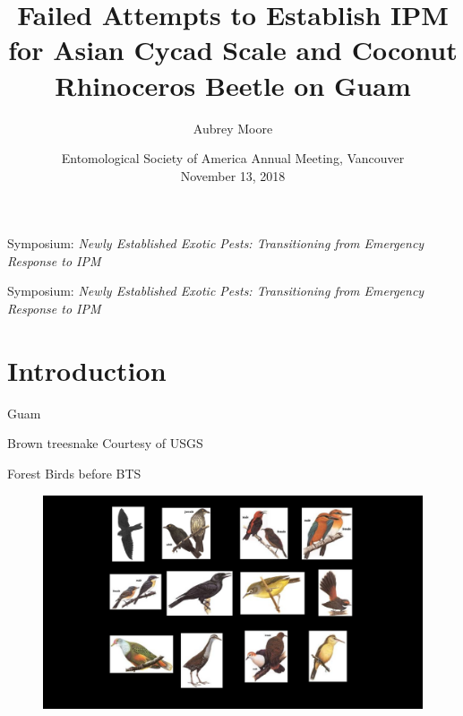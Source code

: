 \documentclass[]{beamer}
\title[IPM Failures on Guam]{Failed Attempts to Establish IPM for Asian Cycad Scale and Coconut Rhinoceros Beetle on Guam}
\author{Aubrey Moore}
\institute[University of Guam]{College of Natural and Applied Sciences\\University of Guam}
\date[]{Entomological Society of America Annual Meeting, Vancouver\\November 13, 2018}
\begin{document}

\begin{frame}
	\scriptsize{Symposium: \textit{Newly Established Exotic Pests: Transitioning from Emergency Response to IPM}}
	\titlepage
\end{frame}

\begin{frame}
	\scriptsize{Symposium: \textit{Newly Established Exotic Pests: Transitioning from Emergency Response to IPM}}
	\titlepage
\end{frame}



\section{Introduction}

\begin{frame}{Guam}
\end{frame}

\begin{frame}{Brown treesnake}
	\tiny{Courtesy of USGS}
\end{frame}

\begin{frame}{Forest Birds before BTS}
	\begin{figure}
		\includegraphics[height=0.8\textheight]{birds-before-bts.png}
	\end{figure}
\end{frame}
\end{document}
